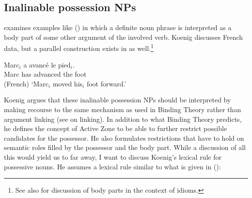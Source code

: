 \documentclass[output=paper
 	        ,biblatex
                ,babelshorthands
                ,newtxmath
                ,draftmode
                ,colorlinks, citecolor=brown
]{langscibook}
\begin{document}



\subsection{Inalinable possession NPs}

\citet{Koenig1999b} examines examples like () in which a definite noun phrase is interpreted
as a body part of some other argument of the involved verb. Koenig discusses French data, but a
parallel construction exists in  as well.\footnote{
See also \crossrefchapterw[\page \pageref{ex-herz-augen}]{idioms} for discussion of body parts in
the context of idioms.
}

\ea
\label{ex-marc-avance-le-pied}
\gll Marc$_i$ a avancé le pied$_i$.\\
     Marc     has advanced the foot\\\hfill{(French)}
\glt `Marc$_i$ moved his$_i$ foot forward.'
\z

Koenig argues that these inalinable possession NPs should be interpreted by making recourse to the
same mechanism as used in Binding Theory rather than argument linking (see
 on linking). In addition to what Binding
Theory predicts, he defines the concept of Active Zone to be able to further restrict possible
candidates for the possessor. He also formulates restrictions that have to hold on semantic roles
filled by the possessor and the body part. While a discussion of all this would yield us to far
away, I want to discuss Koenig's lexical rule for possessive nouns. He assumes a lexical rule
similar to what is given in ():
\end{document}
